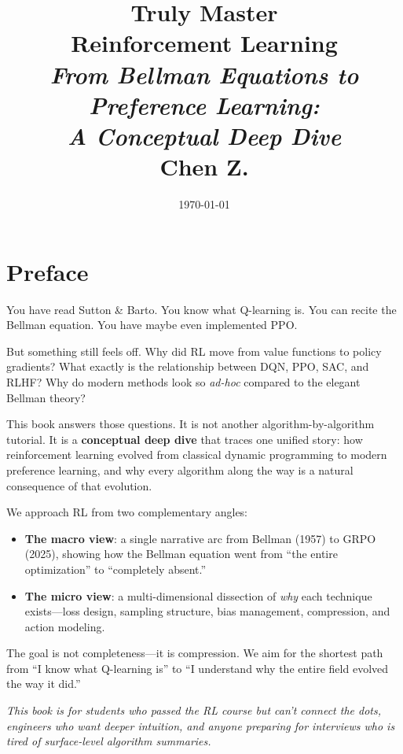 \documentclass[11pt,a4paper,openany]{book}
\title{
    \vspace{-2cm}
    {\Huge\bfseries Truly Master\\Reinforcement Learning}\\[1em]
    {\Large\itshape From Bellman Equations to Preference Learning:\\
    A Conceptual Deep Dive}\\[2em]
    {\large Chen Z.}
}
\date{\today}
\author{}
\theoremstyle{definition}
\theoremstyle{remark}
\begin{document}
\frontmatter
\maketitle

\chapter*{Preface}

You have read Sutton \& Barto. You know what Q-learning is. You can recite the Bellman equation. You have maybe even implemented PPO.

But something still feels off. Why did RL move from value functions to policy gradients? What exactly is the relationship between DQN, PPO, SAC, and RLHF? Why do modern methods look so \emph{ad-hoc} compared to the elegant Bellman theory?

This book answers those questions. It is not another algorithm-by-algorithm tutorial. It is a \textbf{conceptual deep dive} that traces one unified story: how reinforcement learning evolved from classical dynamic programming to modern preference learning, and why every algorithm along the way is a natural consequence of that evolution.

We approach RL from two complementary angles:

\begin{itemize}
    \item \textbf{The macro view}: a single narrative arc from Bellman (1957) to GRPO (2025), showing how the Bellman equation went from ``the entire optimization'' to ``completely absent.''
    \item \textbf{The micro view}: a multi-dimensional dissection of \emph{why} each technique exists---loss design, sampling structure, bias management, compression, and action modeling.
\end{itemize}

The goal is not completeness---it is compression. We aim for the shortest path from ``I know what Q-learning is'' to ``I understand why the entire field evolved the way it did.''

\vspace{1em}
\noindent\textit{This book is for students who passed the RL course but can't connect the dots, engineers who want deeper intuition, and anyone preparing for interviews who is tired of surface-level algorithm summaries.}

\tableofcontents
\end{document}
